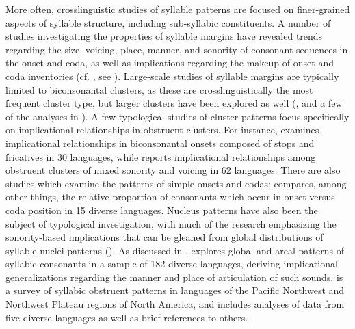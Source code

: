   More often, crosslinguistic studies of syllable patterns are focused on finer-grained aspects of syllable structure, including sub-syllabic constituents. A number of studies investigating the properties of syllable margins have revealed trends regarding the size, voicing, place, manner, and sonority of consonant sequences in the onset and coda, as well as implications regarding the makeup of onset and coda inventories (cf. \citealt{Greenberg19651978}, see ). Large-scale studies of syllable margins are typically limited to biconsonantal clusters, as these are crosslinguistically the most frequent cluster type, but larger clusters have been explored as well (\citealt{VanDam2004}, and a few of the analyses in \citealt{Greenberg19651978}). A few typological studies of cluster patterns focus specifically on implicational relationships in obstruent clusters. For instance, \citet{Morelli1999,Morelli2003} examines implicational relationships in biconsonantal onsets composed of stops and fricatives in 30 languages, while \citet{Kreitman2008} reports implicational relationships among obstruent clusters of mixed sonority and voicing in 62 languages. There are also studies which examine the patterns of simple onsets and codas: \citet{Rousset2004} compares, among other things, the relative proportion of consonants which occur in onset versus coda position in 15 diverse languages. Nucleus patterns have also been the subject of typological investigation, with much of the research emphasizing the sonority-based implications that can be gleaned from global distributions of syllable nuclei patterns (\citealt{Blevins1995,Zec2007}). As discussed in , \citet{Bell1978a} explores global and areal patterns of syllabic consonants in a sample of 182 diverse languages, deriving implicational generalizations regarding the manner and place of articulation of such sounds. \citet{Hoard1978} is a survey of syllabic obstruent patterns in languages of the Pacific Northwest and Northwest Plateau regions of North America, and includes analyses of data from five diverse languages as well as brief references to others.

